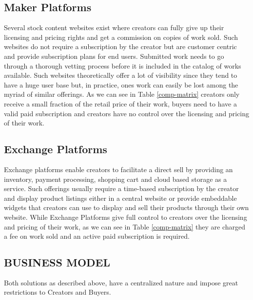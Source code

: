 \subsection{Maker Platforms}

Several stock content websites exist where creators can fully give up their licensing and pricing rights and get a commission on copies of work sold. Such websites do not require a subscription by the creator but are customer centric and provide subscription plans for end users. Submitted work needs to go through a thorough vetting process before it is included in the catalog of works available. Such websites theoretically offer a lot of visibility since they tend to have a huge user base but, in practice, ones work can easily be lost among the myriad of similar offerings. As we can see in Table \ref{comp-matrix} creators only receive a small fraction of the retail price of their work, buyers need to have a valid paid subscription and creators have no control over the licensing and pricing of their work.



\subsection{Exchange Platforms}

Exchange platforms enable creators to facilitate a direct sell by providing an inventory, payment processing, shopping cart and cloud based storage as a service. Such offerings usually require a time-based subscription by the creator and display product listings either in a central website or provide embeddable widgets that creators can use to display and sell their products through their own website. While Exchange Platforms give full control to creators over the licensing and pricing of their work, as we can see in Table \ref{comp-matrix} they are charged a fee on work sold and an active paid subscription is required.
\newline
\bigskip

\subsection{BUSINESS MODEL} \label{businessmodel}

Both solutions as described above, have a centralized nature and impose great restrictions to Creators and Buyers.

